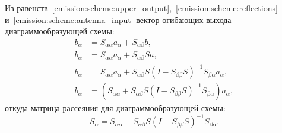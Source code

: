 Из равенств~\eqref{emission:scheme:upper_output},~\eqref{emission:scheme:reflections} и~\eqref{emission:scheme:antenna_input} вектор огибающих выхода
диаграммообразующей схемы:
\begin{align*}
    b_\alpha & = S_{\alpha \alpha} a_\alpha + S_{\alpha \beta} b , \\
    b_\alpha & = S_{\alpha \alpha} a_\alpha + S_{\alpha \beta} S a , \\
    b_\alpha & = S_{\alpha \alpha} a_\alpha + S_{\alpha \beta} S ( I - S_{\beta \beta} S )^{-1} S_{\beta \alpha} a_\alpha , \\
    b_\alpha & = ( S_{\alpha \alpha} + S_{\alpha \beta} S ( I - S_{\beta \beta} S )^{-1} S_{\beta \alpha} ) a_\alpha ,
\end{align*}
откуда матрица рассеяния для диаграммообразующей схемы:
\[
    S_\alpha = S_{\alpha \alpha} + S_{\alpha \beta} S ( I - S_{\beta \beta} S )^{-1} S_{\beta \alpha} .
\]
